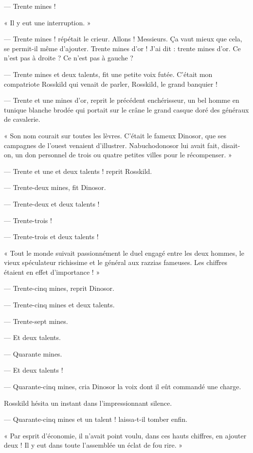 \documentclass[a4paper, 11pt, oneside, polutonikogreek, french]{article}
\begin{document}
--- Trente mines !

« Il y eut une interruption. »

--- Trente mines ! répétait le crieur. Allons ! Messieurs. Ça vaut mieux que cela, se permit-il même d'ajouter. Trente mines d'or ! J'ai dit : trente mines d'or. Ce n'est pas à droite ? Ce n'est pas à gauche ?

--- Trente mines et deux talents, fit une petite voix futée. C'était mon compatriote Rosskild qui venait de parler, Rosskild, le grand banquier !

--- Trente et une mines d'or, reprit le précédent enchérisseur, un bel homme en tunique blanche brodée qui portait sur le crâne le grand casque doré des généraux de cavalerie.

« Son nom courait sur toutes les lèvres. C'était le fameux Dinosor, que ses campagnes de l'ouest venaient d'illustrer. Nabuchodonosor lui avait fait, disait-on, un don personnel de trois ou quatre petites villes pour le récompenser. »

--- Trente et une et deux talents ! reprit Rosskild.

--- Trente-deux mines, fit Dinosor.

--- Trente-deux et deux talents !

--- Trente-trois !

--- Trente-trois et deux talents !

« Tout le monde suivait passionnément le duel engagé entre les deux hommes, le vieux spéculateur richissime et le général aux razzias fameuses. Les chiffres étaient en effet d'importance ! »

--- Trente-cinq mines, reprit Dinosor.

--- Trente-cinq mines et deux talents.

--- Trente-sept mines.

--- Et deux talents.

--- Quarante mines.

--- Et deux talents !

--- Quarante-cinq mines, cria Dinosor la voix dont il eût commandé une charge.

Rosskild hésita un instant dans l'impressionnant silence.

--- Quarante-cinq mines et un talent ! laissa-t-il tomber enfin.

« Par esprit d'économie, il n'avait point voulu, dans ces hauts chiffres, en ajouter deux ! Il y eut dans toute l'assemblée un éclat de fou rire. »
\end{document}
